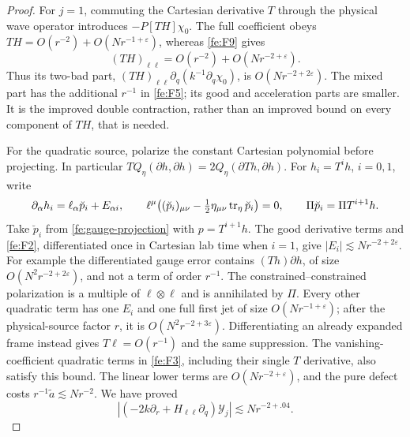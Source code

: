 \begin{proof}
For $j=1$, commuting the Cartesian derivative $T$ through the physical wave
operator introduces $-P[TH]\chi_0$.  The full coefficient obeys
$TH=O(r^{-2})+O(Nr^{-1+\varepsilon})$, whereas \eqref{fe:F9} gives
\begin{equation*}
 (TH)_{\ell\ell}=O(r^{-2})+O(Nr^{-2+\varepsilon}).
\end{equation*}
Thus its two-bad part, $(TH)_{\ell\ell}\partial_q(k^{-1}\partial_q\chi_0)$,
is $O(Nr^{-2+2\varepsilon})$.
The mixed part has the additional $r^{-1}$ in \eqref{fe:F5}; its good and
acceleration parts are smaller.  It is the improved double contraction,
rather than an improved bound on every component of $TH$, that is needed.

For the quadratic source, polarize the constant Cartesian polynomial before
projecting.  In particular
$TQ_\eta(\partial h,\partial h)=2Q_\eta(\partial Th,\partial h)$.
For $h_i=T^ih$, $i=0,1$, write
\begin{equation*}
 \partial_\alpha h_i=\ell_\alpha\breve p_i+E_{\alpha i},
 \qquad
 \ell^\mu\bigl((\breve p_i)_{\mu\nu}
       -\tfrac12\eta_{\mu\nu}\operatorname{tr}_\eta\breve p_i\bigr)=0,
 \qquad \Pi\breve p_i=\Pi T^{i+1}h.
\end{equation*}
Take $\breve p_i$ from \eqref{fe:gauge-projection} with
$p=T^{i+1}h$.  The good derivative terms and
\eqref{fe:F2}, differentiated once in Cartesian lab time when $i=1$, give
$|E_i|\lesssim Nr^{-2+2\varepsilon}$.
For example the differentiated gauge error contains $(Th)\partial h$,
of size $O(N^2r^{-2+2\varepsilon})$, and not a term of order $r^{-1}$.
The constrained--constrained polarization is a multiple of
$\ell\otimes\ell$ and is annihilated by $\Pi$.
Every other quadratic term has one $E_i$ and one full first jet of size
$O(Nr^{-1+\varepsilon})$; after the physical-source factor $r$, it is
$O(N^2r^{-2+3\varepsilon})$.
Differentiating an already expanded frame instead gives $T\ell=O(r^{-1})$
and the same suppression.  The vanishing-coefficient quadratic terms in
\eqref{fe:F3}, including their single $T$ derivative, also satisfy this bound.
The linear lower terms are $O(Nr^{-2+\varepsilon})$, and the pure defect
costs $r^{-1}\widetilde a\lesssim Nr^{-2}$.
We have proved
\begin{equation}\label{fe:news-transport}
 |(-2k\partial_r+H_{\ell\ell}\partial_q)\mathcal Y_j|
       \lesssim Nr^{-2+.04}.
\end{equation}


\end{proof}
